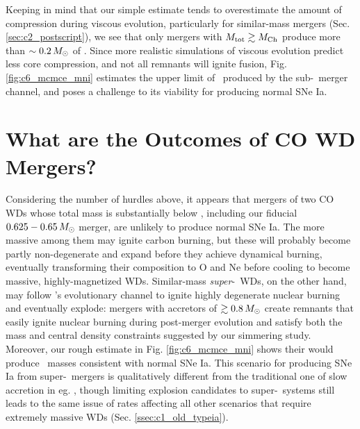 Keeping in mind that our simple estimate tends to overestimate the amount of compression during viscous evolution, particularly for similar-mass mergers (Sec. \ref{sec:c2_postscript}), we see that only mergers with $\Mtot \gtrsim \Mch$ produce more than $\sim0.2\,\Msun$ of \Ni.  Since more realistic simulations of viscous evolution predict less core compression, and not all remnants will ignite fusion, Fig. \ref{fig:c6_mcmce_mni} estimates the upper limit of \Ni\ produced by the sub-\Mch\ merger channel, and poses a challenge to its viability for producing normal SNe Ia.

\section{What are the Outcomes of CO WD Mergers?}

Considering the number of hurdles above, it appears that mergers of two CO WDs whose total mass is substantially below \Mch, including our fiducial $0.625 - 0.65\,\Msun$ merger, are unlikely to produce normal SNe Ia.  The more massive among them may ignite carbon burning, but these will probably become partly non-degenerate and expand before they achieve dynamical burning, eventually transforming their composition to O and Ne before cooling to become massive, highly-magnetized WDs.  Similar-mass \textit{super}-\Mch\ WDs, on the other hand, may follow \citeal{vkercj10}'s evolutionary channel to ignite highly degenerate nuclear burning and eventually explode: mergers with accretors of $\gtrsim0.8\,\Msun$ create remnants that easily ignite nuclear burning during post-merger evolution and satisfy both the mass and central density constraints suggested by our simmering study.  Moreover, our rough estimate in Fig. \ref{fig:c6_mcmce_mni} shows their would produce \Ni\ masses consistent with normal SNe Ia.  This scenario for producing SNe Ia from super-\Mch\ mergers is qualitatively different from the traditional one of slow accretion in eg. \cite{yoonpr07}, though limiting explosion candidates to super-\Mch\ systems still leads to the same issue of rates affecting all other scenarios that require extremely massive WDs (Sec. \ref{ssec:c1_old_typeia}).


